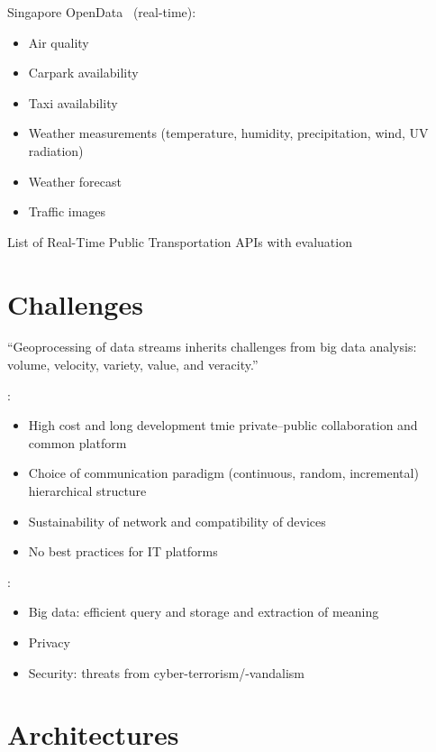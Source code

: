 \documentclass[parskip=half]{scrartcl}
\begin{document}
Singapore OpenData~\cite{data.gov.sg.2020, LandTransportAuthorityofSingapore.2020} (real-time):
\begin{itemize}
	\item Air quality
	\item Carpark availability
	\item Taxi availability
	\item Weather measurements (temperature, humidity, precipitation, wind, UV radiation)
	\item Weather forecast
	\item Traffic images
\end{itemize}

List of Real-Time Public Transportation APIs with evaluation~\cite{AblyRealtime.2019}


\section{Challenges}
\enquote{Geoprocessing of data streams inherits challenges from big data analysis: volume, velocity, variety, value, and veracity.}~\cite[p.~1]{Morales.2015}

\cite[p.~2~ff.]{Ahmed.2018}:
\begin{itemize}
	\item High cost and long development tmie \textrightarrow private--public collaboration and common platform
	\item Choice of communication paradigm (continuous, random, incremental) \textrightarrow hierarchical structure
	\item Sustainability of network and compatibility of devices
	\item No best practices for IT platforms
\end{itemize}

\cite[p.~9~f.]{Petrolo.2017}:
\begin{itemize}
	\item Big data: efficient query and storage and extraction of meaning
	\item Privacy
	\item Security: threats from cyber-terrorism/-vandalism
\end{itemize}


\section{Architectures}
\end{document}
